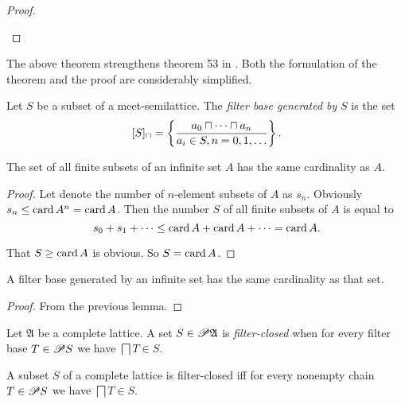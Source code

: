 \begin{proof}
\begin{description}
\begin{description}
\end{description}
\end{description}
\end{proof}
\begin{rem}
The above theorem strengthens theorem 53 in \cite{filters}. Both
the formulation of the theorem and the proof are considerably simplified.\end{rem}
\begin{defn}
Let $S$ be a subset of a meet-semilattice.
The \emph{filter base generated by} $S$ is the set
\[
[S]_{\sqcap}=\left\{ \frac{a_{0}\sqcap\dots\sqcap a_{n}}{a_{i}\in S,n=0,1,\dots}\right\}.
\]
\end{defn}
\begin{lem}
The set of all finite subsets of an infinite set $A$ has the same
cardinality as $A$.\end{lem}
\begin{proof}
Let denote the number of $n$-element subsets of $A$ as $s_{n}$.
Obviously $s_{n}\le\operatorname{card} A^{n}=\operatorname{card} A$. Then the number $S$ of
all finite subsets of $A$ is equal to
\[
s_{0}+s_{1}+\dots\le\operatorname{card} A+\operatorname{card} A+\dots=\operatorname{card} A.
\]


That $S\ge\operatorname{card} A$ is obvious. So $S=\operatorname{card} A$.\end{proof}
\begin{lem}
A filter base generated by an infinite set has the same cardinality
as that set.\end{lem}
\begin{proof}
From the previous lemma.\end{proof}
\begin{defn}
Let $\mathfrak{A}$ be a complete lattice. A
set $S\in\mathscr{P}\mathfrak{A}$ is \emph{filter-closed} when for every
filter base $T\in\mathscr{P} S$ we have $\bigsqcap T\in S$.\end{defn}
\begin{thm}
A subset $S$ of a complete lattice is filter-closed iff for every
nonempty chain $T\in\mathscr{P} S$ we have $\bigsqcap T\in S$.\end{thm}
